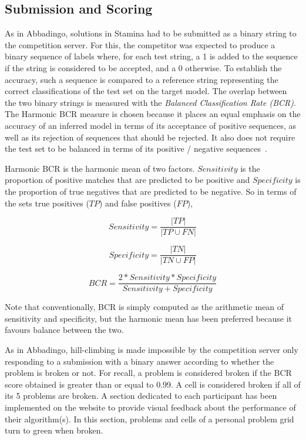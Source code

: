 \subsection{Submission and Scoring}

As in Abbadingo, solutions in Stamina had to be submitted as a binary string to the competition server. For this, the competitor was expected to produce a binary sequence of labels where, for each test string, a 1 is added to the sequence if the string is considered to be accepted, and a 0 otherwise. To establish the accuracy, such a sequence is compared to a reference string representing the correct classifications of the test set on the target model. The overlap between the two binary strings is measured with the \emph{Balanced Classification Rate (BCR)}. The Harmonic BCR measure is chosen because it places an equal emphasis on the accuracy of an inferred model in terms of its acceptance of positive sequences, as well as its rejection of sequences that should be rejected. It also does not require the test set to be balanced in terms of its positive / negative sequences~\cite{Walkinshaw2008}. 

Harmonic BCR is the harmonic mean of two factors. $Sensitivity$ is the proportion of positive matches that are predicted to be positive and $Specificity$ is the proportion of true negatives that are predicted to be negative. So in terms of the sets true positives ($TP$) and false positives ($FP$), 

$$Sensitivity=\frac{|TP|}{|TP \cup FN|}$$ 

$$Specificity=\frac{|TN|}{|TN \cup FP|}$$

$$BCR=\frac{2*Sensitivity*Specificity}{Sensitivity + Specificity}$$

Note that conventionally, BCR is simply computed as the arithmetic mean of sensitivity and specificity, but the harmonic mean has been preferred because it favours balance between the two.

As in Abbadingo, hill-climbing is made impossible by the competition server only responding to a submission with a binary answer according to whether the problem is broken or not. For recall, a problem is considered broken if the BCR score obtained is greater than or equal to 0.99. A cell is considered broken if all of its 5 problems are broken. A section dedicated to each participant has been implemented on the website to provide visual feedback about the performance of their algorithm(s). In this section, problems and cells of a personal problem grid turn to green when broken.

